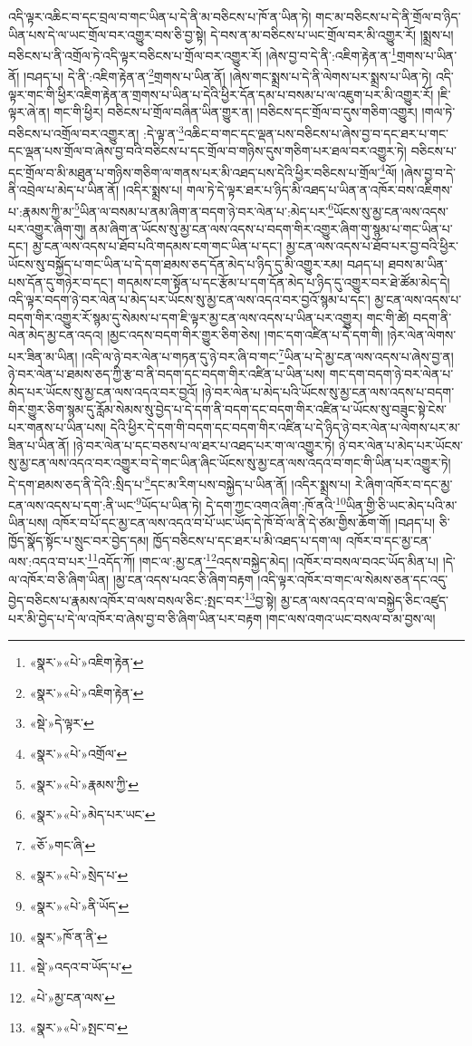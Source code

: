 འདི་ལྟར་འཆིང་བ་དང་བྲལ་བ་གང་ཡིན་པ་དེ་ནི་མ་བཅིངས་པ་ཁོ་ན་ཡིན་ཏེ། གང་མ་བཅིངས་པ་དེ་ནི་གྲོལ་བ་ཉིད་ཡིན་པས་དེ་ལ་ཡང་གྲོལ་བར་འགྱུར་བས་ཅི་བྱ་སྟེ། དེ་བས་ན་མ་བཅིངས་པ་ཡང་གྲོལ་བར་མི་འགྱུར་རོ། །སྨྲས་པ། བཅིངས་པ་ནི་འགྲོལ་ཏེ་འདི་ལྟར་བཅིངས་པ་གྲོལ་བར་འགྱུར་རོ། །ཞེས་བྱ་བ་དེ་ནི་:འཇིག་རྟེན་ན་\footnote{«སྣར་»«པེ་»འཇིག་རྟེན་}གྲགས་པ་ཡིན་ནོ། །བཤད་པ། དེ་ནི་:འཇིག་རྟེན་ན་\footnote{«སྣར་»«པེ་»འཇིག་རྟེན་}གྲགས་པ་ཡིན་ནོ། །ཞེས་གང་སྨྲས་པ་དེ་ནི་ལེགས་པར་སྨྲས་པ་ཡིན་ཏེ། འདི་ལྟར་གང་གི་ཕྱིར་འཇིག་རྟེན་ན་གྲགས་པ་ཡིན་པ་དེའི་ཕྱིར་དོན་དམ་པ་བསམ་པ་ལ་འཇུག་པར་མི་འགྱུར་རོ། །ཇི་ལྟར་ཞེ་ན། གང་གི་ཕྱིར། བཅིངས་པ་གྲོལ་བཞིན་ཡིན་གྱུར་ན། །བཅིངས་དང་གྲོལ་བ་དུས་གཅིག་འགྱུར། །གལ་ཏེ་བཅིངས་པ་འགྲོལ་བར་འགྱུར་ན། :དེ་ལྟ་ན་\footnote{«སྡེ་»དེ་ལྟར་}འཆིང་བ་གང་དང་ལྡན་པས་བཅིངས་པ་ཞེས་བྱ་བ་དང་ཐར་པ་གང་དང་ལྡན་པས་གྲོལ་བ་ཞེས་བྱ་བའི་བཅིངས་པ་དང་གྲོལ་བ་གཉིས་དུས་གཅིག་པར་ཐལ་བར་འགྱུར་ཏེ། བཅིངས་པ་དང་གྲོལ་བ་མི་མཐུན་པ་གཉིས་གཅིག་ལ་གནས་པར་མི་འཐད་པས་དེའི་ཕྱིར་བཅིངས་པ་གྲོལ་\footnote{«སྣར་»«པེ་»འགྲོལ་}ལོ། །ཞེས་བྱ་བ་དེ་ནི་འབྲེལ་པ་མེད་པ་ཡིན་ནོ། །འདིར་སྨྲས་པ། གལ་ཏེ་དེ་ལྟར་ཐར་པ་ཉིད་མི་འཐད་པ་ཡིན་ན་འཁོར་བས་འཇིགས་པ་:རྣམས་ཀྱི་མ་\footnote{«སྣར་»«པེ་»རྣམས་ཀྱི་}ཡིན་ལ་བསམ་པ་ནམ་ཞིག་ན་བདག་ཉེ་བར་ལེན་པ་:མེད་པར་\footnote{«སྣར་»«པེ་»མེད་པར་ཡང་}ཡོངས་སུ་མྱ་ངན་ལས་འདས་པར་འགྱུར་ཞིག་གུ། ནམ་ཞིག་ན་ཡོངས་སུ་མྱ་ངན་ལས་འདས་པ་བདག་གིར་འགྱུར་ཞིག་གུ་སྙམ་པ་གང་ཡིན་པ་དང་། མྱ་ངན་ལས་འདས་པ་ཐོབ་པའི་གདམས་ངག་གང་ཡིན་པ་དང་། མྱ་ངན་ལས་འདས་པ་ཐོབ་པར་བྱ་བའི་ཕྱིར་ཡོངས་སུ་བསྐྱོད་པ་གང་ཡིན་པ་དེ་དག་ཐམས་ཅད་དོན་མེད་པ་ཉིད་དུ་མི་འགྱུར་རམ། བཤད་པ། ཐབས་མ་ཡིན་པས་དོན་དུ་གཉེར་བ་དང་། གདམས་ངག་སྟོན་པ་དང་རྩོམ་པ་དག་དོན་མེད་པ་ཉིད་དུ་འགྱུར་བར་ཐེ་ཚོམ་མེད་དེ། འདི་ལྟར་བདག་ཉེ་བར་ལེན་པ་མེད་པར་ཡོངས་སུ་མྱ་ངན་ལས་འདའ་བར་བྱའོ་སྙམ་པ་དང་། མྱ་ངན་ལས་འདས་པ་བདག་གིར་འགྱུར་རོ་སྙམ་དུ་སེམས་པ་དག་ཇི་ལྟར་མྱ་ངན་ལས་འདས་པ་ཡིན་པར་འགྱུར། གང་གི་ཚེ། བདག་ནི་ལེན་མེད་མྱ་ངན་འདའ། །མྱང་འདས་བདག་གིར་གྱུར་ཅིག་ཅེས། །གང་དག་འཛིན་པ་དེ་དག་གི། །ཉེར་ལེན་ལེགས་པར་ཟིན་མ་ཡིན། །འདི་ལ་ཉེ་བར་ལེན་པ་གཏན་དུ་ཉེ་བར་ཞི་བ་གང་\footnote{«ཅོ་»གང་ཞི་}ཡིན་པ་དེ་མྱ་ངན་ལས་འདས་པ་ཞེས་བྱ་ན། ཉེ་བར་ལེན་པ་ཐམས་ཅད་ཀྱི་རྩ་བ་ནི་བདག་དང་བདག་གིར་འཛིན་པ་ཡིན་པས། གང་དག་བདག་ཉེ་བར་ལེན་པ་མེད་པར་ཡོངས་སུ་མྱ་ངན་ལས་འདའ་བར་བྱའོ། །ཉེ་བར་ལེན་པ་མེད་པའི་ཡོངས་སུ་མྱ་ངན་ལས་འདས་པ་བདག་གིར་གྱུར་ཅིག་སྙམ་དུ་རློམ་སེམས་སུ་བྱེད་པ་དེ་དག་ནི་བདག་དང་བདག་གིར་འཛིན་པ་ཡོངས་སུ་བཟུང་སྟེ་ངེས་པར་གནས་པ་ཡིན་པས། དེའི་ཕྱིར་དེ་དག་གི་བདག་དང་བདག་གིར་འཛིན་པ་དེ་ཉིད་ཉེ་བར་ལེན་པ་ལེགས་པར་མ་ཟིན་པ་ཡིན་ནོ། །ཉེ་བར་ལེན་པ་དང་བཅས་པ་ལ་ཐར་པ་འཐད་པར་ག་ལ་འགྱུར་ཏེ། ཉེ་བར་ལེན་པ་མེད་པར་ཡོངས་སུ་མྱ་ངན་ལས་འདའ་བར་འགྱུར་བ་དེ་གང་ཡིན་ཞིང་ཡོངས་སུ་མྱ་ངན་ལས་འདའ་བ་གང་གི་ཡིན་པར་འགྱུར་ཏེ། དེ་དག་ཐམས་ཅད་ནི་དེའི་:སྲིད་པ་\footnote{«སྣར་»«པེ་»སྲེད་པ་}དང་མ་རིག་པས་བསྐྱེད་པ་ཡིན་ནོ། །འདིར་སྨྲས་པ། རེ་ཞིག་འཁོར་བ་དང་མྱ་ངན་ལས་འདས་པ་དག་:ནི་ཡང་\footnote{«སྣར་»«པེ་»ནི་ཡོད་}ཡོད་པ་ཡིན་ཏེ། དེ་དག་ཀྱང་འགའ་ཞིག་:ཁོ་ནའི་\footnote{«སྣར་»ཁོ་ན་ནི་}ཡིན་གྱི་ཅི་ཡང་མེད་པའི་མ་ཡིན་པས། འཁོར་བ་པོ་དང་མྱ་ངན་ལས་འདའ་བ་པོ་ཡང་ཡོད་དེ་ཁོ་བོ་ལ་ནི་དེ་ཙམ་གྱིས་ཆོག་གོ། །བཤད་པ། ཅི་ཁྱོད་སྣོད་སྟོང་པ་སྲུང་བར་བྱེད་དམ། ཁྱོད་བཅིངས་པ་དང་ཐར་པ་མི་འཐད་པ་དག་ལ། འཁོར་བ་དང་མྱ་ངན་ལས་:འདའ་བ་པར་\footnote{«སྡེ་»འདའ་བ་ཡོད་པ་}འདོད་ཀོ། །གང་ལ་:མྱ་ངན་\footnote{«པེ་»མྱ་ངན་ལས་}འདས་བསྐྱེད་མེད། །འཁོར་བ་བསལ་བའང་ཡོད་མིན་པ། །དེ་ལ་འཁོར་བ་ཅི་ཞིག་ཡིན། །མྱ་ངན་འདས་པའང་ཅི་ཞིག་བརྟག །འདི་ལྟར་འཁོར་བ་གང་ལ་སེམས་ཅན་དང་འདུ་བྱེད་བཅིངས་པ་རྣམས་འཁོར་བ་ལས་བསལ་ཅིང་:སྤང་བར་\footnote{«སྣར་»«པེ་»སྤང་བ་}བྱ་སྟེ། མྱ་ངན་ལས་འདའ་བ་ལ་བསྐྱེད་ཅིང་འཛུད་པར་མི་བྱེད་པ་དེ་ལ་འཁོར་བ་ཞེས་བྱ་བ་ཅི་ཞིག་ཡིན་པར་བརྟག །གང་ལས་འགའ་ཡང་བསལ་བ་མ་བྱས་ལ། 